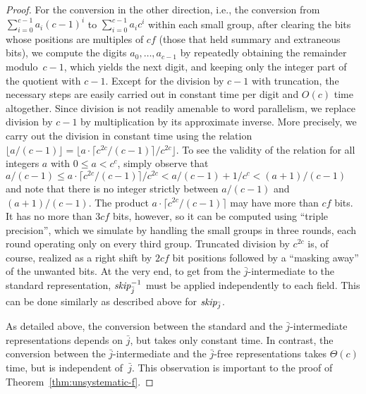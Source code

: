 \documentclass[envcountsame,envcountsect,undated,nolinenumbers]{lnthi}
\def\Tvn#1{\hbox{\textit{#1\/}}}
\def\Tfloor#1{\lfloor #1\rfloor}
\def\Tceil#1{\lceil #1\rceil}
\def\jj{{\bar j}}
\begin{document}
\begin{proof}
For the conversion in the other direction,
i.e., the conversion from
$\sum_{i=0}^{c-1}a_i(c-1)^i$ to
$\sum_{i=0}^{c-1}a_i c^i$ within each small group,
after clearing the bits whose positions are
multiples of $c f$ (those that held
summary and extraneous bits),
we compute the digits $a_0,\ldots,a_{c-1}$
by repeatedly obtaining the remainder modulo~$c-1$,
which yields the next digit, and keeping
only the integer part of the quotient with $c-1$.
Except for the division by $c-1$ with
truncation, the necessary steps are easily carried out in
constant time per digit and $O(c)$ time altogether.
Since division is not readily amenable to
word parallelism, we replace division by $c-1$
by multiplication by its approximate inverse.
More precisely, we carry out the division in
constant time using the relation
$\Tfloor{a/{(c-1)}}
=\Tfloor{{{a\cdot\Tceil{{{c^{2 c}}/{(c-1)}}}}/{c^{2 c}}}}$.
To see the validity of the relation for
all integers $a$ with $0\le a<c^c$,
simply observe that
${a/{(c-1)}}\le {{a\cdot\Tceil{{{c^{2 c}}/{(c-1)}}}}/{c^{2 c}}}
<{a/{(c-1)}}+{1/{c^c}}<{{(a+1)}/{(c-1)}}$
and note that there is no integer
strictly between ${a/{(c-1)}}$ and ${{(a+1)}/{(c-1)}}$.
The product $a\cdot\Tceil{{{c^{2 c}}/{(c-1)}}}$
may have more than $c f$ bits.
It has no more than $3 c f$ bits, however, so it can
be computed using ``triple precision'', which
we simulate by handling the small groups
in three rounds, each round operating only on
every third group.
Truncated division by $c^{2 c}$ is, of course, realized
as a right shift by $2 c f$ bit positions followed by
a ``masking away'' of the unwanted bits.
At the very end, to get from the
$\jj$-intermediate to the standard representation,
$\Tvn{skip}^{-1}_\jj$ must be
applied independently to each field.
This can be done similarly as described above
for $\Tvn{skip}_\jj$.

As detailed above, the conversion between
the standard and the $\jj$-intermediate representations
depends on $\jj$, but takes only constant time.
In contrast, the conversion between the
$\jj$-intermediate and the $\jj$-free representations
takes $\Theta(c)$ time, but is independent of~$\jj$.
This observation is important to
the proof of Theorem~\ref{thm:unsystematic-f}.


\end{proof}
\end{document}
